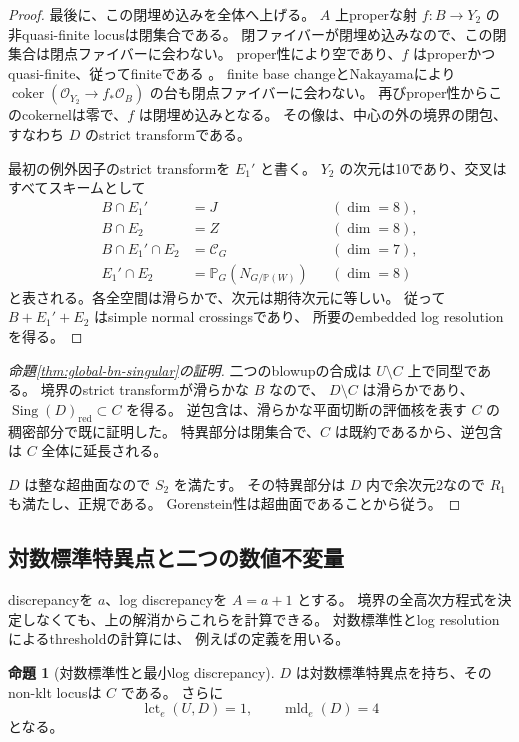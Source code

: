 \documentclass[a4paper,11pt]{ltjsarticle}
\newcommand{\mathscr}{\mathcal}
\theoremstyle{definition}
\newtheorem{theorem}{命題}[section]
\newcommand{\OO}{\mathcal O}
\newcommand{\PP}{\mathbb P}
\begin{document}
\begin{proof}
最後に、この閉埋め込みを全体へ上げる。
$A$ 上properな射 $f:B\to Y_2$ の非quasi-finite locusは閉集合である。
閉ファイバーが閉埋め込みなので、この閉集合は閉点ファイバーに会わない。
proper性により空であり、$f$ はproperかつquasi-finite、従ってfiniteである
\cite{StacksProperFinite}。
finite base changeとNakayamaにより
$\operatorname{coker}(\OO_{Y_2}\to f_*\OO_B)$ の台も閉点ファイバーに会わない。
再びproper性からこのcokernelは零で、$f$ は閉埋め込みとなる。
その像は、中心の外の境界の閉包、すなわち $D$ のstrict transformである。

最初の例外因子のstrict transformを $E_1'$ と書く。
$Y_2$ の次元は10であり、交叉はすべてスキームとして
\[
 \begin{aligned}
 B\cap E_1'&=J &&(\dim=8),\\
 B\cap E_2&=Z &&(\dim=8),\\
 B\cap E_1'\cap E_2&=\mathscr C_G &&(\dim=7),\\
 E_1'\cap E_2&=\PP_G(N_{G/\PP(W)}) &&(\dim=8)
 \end{aligned}
\]
と表される。各全空間は滑らかで、次元は期待次元に等しい。
従って $B+E_1'+E_2$ はsimple normal crossingsであり、
所要のembedded log resolutionを得る。
\end{proof}

\begin{proof}[命題\ref{thm:global-bn-singular}の証明]
二つのblowupの合成は $U\setminus C$ 上で同型である。
境界のstrict transformが滑らかな $B$ なので、
$D\setminus C$ は滑らかであり、
$\operatorname{Sing}(D)_{\mathrm{red}}\subset C$ を得る。
逆包含は、滑らかな平面切断の評価核を表す $C$ の稠密部分で既に証明した。
特異部分は閉集合で、$C$ は既約であるから、逆包含は $C$ 全体に延長される。

$D$ は整な超曲面なので $S_2$ を満たす。
その特異部分は $D$ 内で余次元2なので $R_1$ も満たし、正規である。
Gorenstein性は超曲面であることから従う。
\end{proof}

\subsection{対数標準特異点と二つの数値不変量}

discrepancyを $a$、log discrepancyを $A=a+1$ とする。
境界の全高次方程式を決定しなくても、上の解消からこれらを計算できる。
対数標準性とlog resolutionによるthresholdの計算には、
例えば\cite[Section 1]{MustataSing}の定義を用いる。

\begin{theorem}[対数標準性と最小log discrepancy]\label{thm:bn-log-invariants}
$D$ は対数標準特異点を持ち、そのnon-klt locusは $C$ である。
さらに
\[
 \operatorname{lct}_e(U,D)=1,\qquad
 \operatorname{mld}_e(D)=4
\]
となる。
\end{theorem}
\end{document}
